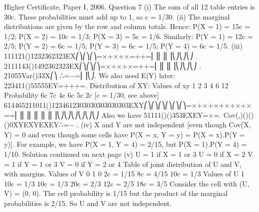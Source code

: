 Higher Certificate, Paper I, 2006. Question 7
(i) The sum of all 12 table entries is 30c. These probabilities must add up to 1, so c = 1/30.
(ii) The marginal distributions are given by the row and column totals.
Hence: P(X = 1) = 15c = 1/2; P(X = 2) = 10c = 1/3; P(X = 3) = 5c = 1/6.
Similarly: P(Y = 1) = 12c = 2/5; P(Y = 2) = 6c = 1/5; P(Y = 3) = 6c = 1/5; P(Y = 4) = 6c = 1/5.
(iii) 111121()1232362323EX⎛⎞⎛⎞⎛⎞=×+×+×=++=⎜⎟⎜⎟⎜⎟⎝⎠⎝⎠⎝⎠ .
2111143()1492362323EX⎛⎞⎛⎞⎛⎞=×+×+×=++=⎜⎟⎜⎟⎜⎟⎝⎠⎝⎠⎝⎠ .
21055Var()33X⎛⎞ ∴=−=⎜⎟⎝⎠.
We also need E(Y) later: 223411()55555EY=+++=.
Distribution of XY:
Values of xy
1
2
3
4
6
12
Probability
6c
7c
4c
6c
5c
2c
[c = 1/30, see above]
614465211011()1234612303030303030303EXY⎛⎞⎛⎞⎛⎞⎛⎞⎛⎞⎛⎞=×+×+×+×+×+×==⎜⎟⎜⎟⎜⎟⎜⎟⎜⎟⎜⎟⎝⎠⎝⎠⎝⎠⎝⎠⎝⎠⎝⎠
Also we have 51111()()353EXEY=×=.
Cov(,)()()()0XYEXYEXEY∴=− .
(iv) X and Y are not independent [even though Cov(X, Y) = 0 and even though some cells have P(X = x, Y = y) = P(X = x).P(Y = y)]. For example, we have P(X = 1, Y = 4) = 2/15, but P(X = 1).P(Y = 4) = 1/10.
Solution continued on next page
(v) U = 1 if X = 1 or 3 U = 0 if X = 2
V = 1 if Y = 1 or 3 V = 0 if Y = 2 or 4
Table of joint distribution of U and V, with margins.
Values of V
0
1
0
2c = 1/15
8c = 4/15
10c = 1/3
Values of U
1
10c = 1/3
10c = 1/3
20c = 2/3
12c = 2/5
18c = 3/5
Consider the cell with (U, V) = (0, 0). The cell probability is 1/15 but the product of the marginal probabilities is 2/15. So U and V are not independent.
